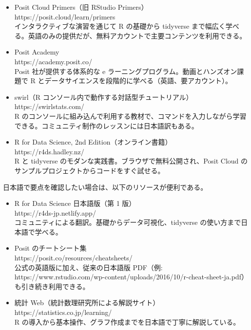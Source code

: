 \documentclass[
  letterpaper,
  xelatex,
  ja=standard, xelatex]{bxjsbook}
\providecommand{\tightlist}{%
  \setlength{\itemsep}{0pt}\setlength{\parskip}{0pt}}\usepackage{longtable,booktabs,array}
\begin{document}
\begin{itemize}
\tightlist
\item
  Posit Cloud Primers（旧 RStudio Primers）\\
  https://posit.cloud/learn/primers\\
  インタラクティブな演習を通じて R の基礎から tidyverse
  まで幅広く学べる。英語のみの提供だが、無料アカウントで主要コンテンツを利用できる。
\item
  Posit Academy\\
  https://academy.posit.co/\\
  Posit 社が提供する体系的な e
  ラーニングプログラム。動画とハンズオン課題で R
  とデータサイエンスを段階的に学べる（英語、要アカウント）。
\item
  swirl（R コンソール内で動作する対話型チュートリアル）\\
  https://swirlstats.com/\\
  R
  のコンソールに組み込んで利用する教材で、コマンドを入力しながら学習できる。コミュニティ制作のレッスンには日本語訳もある。
\item
  R for Data Science, 2nd Edition（オンライン書籍）\\
  https://r4ds.hadley.nz/\\
  R と tidyverse のモダンな実践書。ブラウザで無料公開され、Posit Cloud
  のサンプルプロジェクトからコードをすぐ試せる。
\end{itemize}

日本語で要点を確認したい場合は、以下のリソースが便利である。

\begin{itemize}
\tightlist
\item
  R for Data Science 日本語版（第 1 版）\\
  https://r4ds-jp.netlify.app/\\
  コミュニティによる翻訳。基礎からデータ可視化、tidyverse
  の使い方まで日本語で学べる。
\item
  Posit のチートシート集\\
  https://posit.co/resources/cheatsheets/\\
  公式の英語版に加え、従来の日本語版 PDF（例:
  https://www.rstudio.com/wp-content/uploads/2016/10/r-cheat-sheet-ja.pdf）も引き続き利用できる。
\item
  統計 Web（統計数理研究所による解説サイト）\\
  https://statistics.co.jp/learning/\\
  R の導入から基本操作、グラフ作成までを日本語で丁寧に解説している。
\end{itemize}
\end{document}
